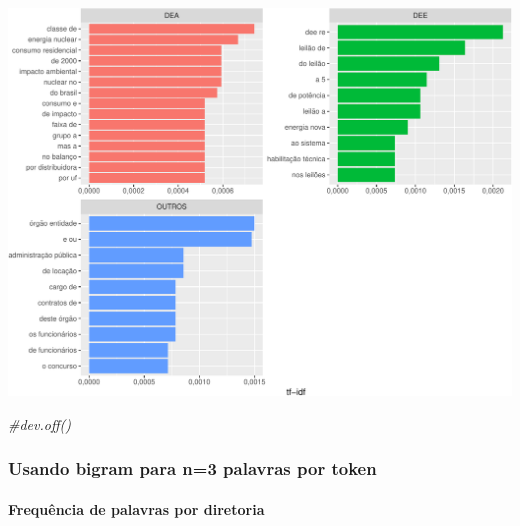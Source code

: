 \documentclass[]{article}
\newenvironment{Shaded}{\begin{snugshade}}{\end{snugshade}}
\newcommand{\CommentTok}[1]{\textcolor[rgb]{0.56,0.35,0.01}{\textit{#1}}}
\let\oldparagraph\paragraph
\renewcommand{\paragraph}[1]{\oldparagraph{#1}\mbox{}}
\begin{document}
\includegraphics{markdown_v40_files/figure-latex/03_freq_palavras_dir-1.pdf}

\begin{Shaded}
\begin{Highlighting}[]
\CommentTok{#dev.off()}
\end{Highlighting}
\end{Shaded}

\subsubsection{Usando bigram para n=3 palavras por
token}\label{usando-bigram-para-n3-palavras-por-token}

\paragraph{Frequência de palavras por
diretoria}\label{frequencia-de-palavras-por-diretoria-2}
\end{document}

